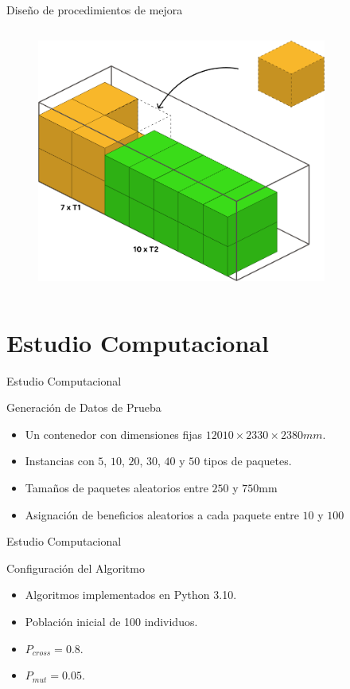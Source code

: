 \documentclass[handout]{beamer}
\begin{document}
\begin{frame}{Diseño de procedimientos de mejora}
\begin{columns}
\begin{column}{0.4\textwidth}
\begin{figure}
                \includegraphics[width=0.85\textwidth]{pic/llenado_adicional_final.png}
            \end{figure}
        \end{column}
    \end{columns}
\end{frame}

\section[Experimentación]{Estudio Computacional}

\begin{frame}{Estudio Computacional}
    \begin{exampleblock}{Generación de Datos de Prueba}
        \begin{itemize}[<+-| alert@+>]
            \item Un contenedor con dimensiones fijas $12010 \times 2330 \times 2380 mm$.
            \item Instancias con $5$, $10$, $20$, $30$, $40$ y $50$ tipos de paquetes.
            \item Tamaños de paquetes aleatorios entre $250$ y $750$mm
            \item Asignación de beneficios aleatorios a cada paquete entre $10$ y $100$
        \end{itemize}
    \end{exampleblock}
\end{frame}

\begin{frame}{Estudio Computacional}
    \begin{exampleblock}{Configuración del Algoritmo}
        \begin{itemize}[<+-| alert@+>]
            \item Algoritmos implementados en Python 3.10.
            \item Población inicial de 100 individuos.
            \item $P_{cross}=0.8$.
            \item $P_{mut}=0.05$.
        \end{itemize}
    \end{exampleblock}
\end{frame}
\end{document}
